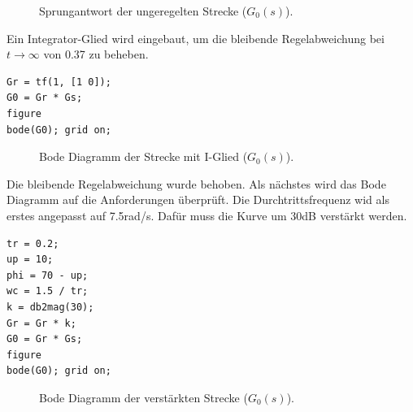 \documentclass[11pt,a4paper]{article}
\newlength\figureheight
\newlength\figurewidth
\begin{document}
\begin{figure}[H]
    \centering
    \setlength\figureheight{6cm}
    \setlength{} %
    
    
    
    \caption{Sprungantwort der ungeregelten Strecke ($G_{\mathrm{0}}(s)$).}
    \label{fig:matlab_plot15}
\end{figure}

\noindent Ein Integrator-Glied wird eingebaut, um die bleibende Regelabweichung bei $t \to \infty$ von 0.37 zu beheben.

\begin{lstlisting}
Gr = tf(1, [1 0]);
G0 = Gr * Gs;
figure
bode(G0); grid on;
\end{lstlisting}

\begin{figure}[H]
    \centering
    \setlength\figureheight{6cm}
    \setlength{} %
    
    
    
    \caption{Bode Diagramm der Strecke mit I-Glied ($G_{\mathrm{0}}(s)$).}
    \label{fig:matlab_plot16}
\end{figure}

\noindent Die bleibende Regelabweichung wurde behoben. Als nächstes wird das Bode Diagramm auf die Anforderungen überprüft. Die Durchtrittsfrequenz wid als erstes angepasst auf 7.5rad/s. Dafür muss die Kurve um 30dB verstärkt werden.

\begin{lstlisting}
tr = 0.2;
up = 10;
phi = 70 - up;
wc = 1.5 / tr;
k = db2mag(30); 
Gr = Gr * k; 
G0 = Gr * Gs; 
figure
bode(G0); grid on; 
\end{lstlisting}

\begin{figure}[H]
    \centering
    \setlength\figureheight{6cm}
    \setlength{} %
    
    
    
    \caption{Bode Diagramm der verstärkten Strecke ($G_{\mathrm{0}}(s)$).}
    \label{fig:matlab_plot17}

\end{figure}
\end{document}
